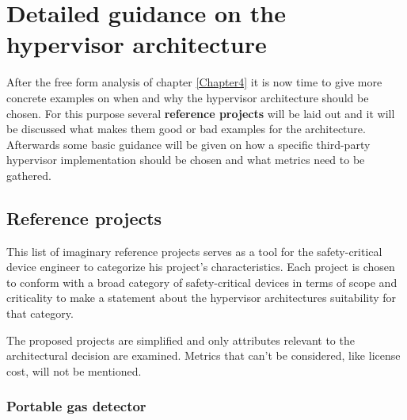 
\chapter{Detailed guidance on the hypervisor architecture} %

\label{Chapter5} %


\newcommand{\keyword}[1]{\textbf{#1}}
\newcommand{\tabhead}[1]{\textbf{#1}}
\newcommand{\code}[1]{\texttt{#1}}
\newcommand{\file}[1]{\texttt{\bfseries#1}}
\newcommand{\option}[1]{\texttt{\itshape#1}}

After the free form analysis of chapter \ref{Chapter4} it is now time to give more concrete examples on when and why the hypervisor architecture should be chosen. For this purpose several \keyword{reference projects} will be laid out and it will be discussed what makes them good or bad examples for the architecture. Afterwards some basic guidance will be given on how a specific third-party hypervisor implementation should be chosen and what metrics need to be gathered.
\section{Reference projects} \label{ref-projects}
This list of imaginary reference projects serves as a tool for the safety-critical device engineer to categorize his project's characteristics. Each project is chosen to conform with a broad category of safety-critical devices in terms of scope and criticality to make a statement about the hypervisor architectures suitability for that category.

The proposed projects are simplified and only attributes relevant to the architectural decision are examined. Metrics that can't be considered, like license cost, will not be mentioned. 

\subsection{Portable gas detector}
